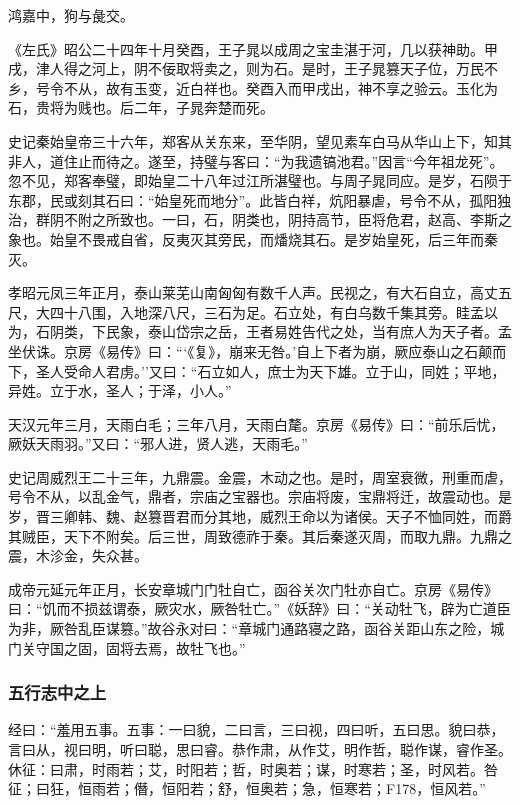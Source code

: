 \documentclass[]{article}
\begin{document}
鸿嘉中，狗与彘交。

《左氏》昭公二十四年十月癸酉，王子晁以成周之宝圭湛于河，几以获神助。甲戌，津人得之河上，阴不佞取将卖之，则为石。是时，王子晁篡天子位，万民不乡，号令不从，故有玉变，近白祥也。癸酉入而甲戌出，神不享之验云。玉化为石，贵将为贱也。后二年，子晁奔楚而死。

史记秦始皇帝三十六年，郑客从关东来，至华阴，望见素车白马从华山上下，知其非人，道住止而待之。遂至，持璧与客曰：``为我遗镐池君。''因言``今年祖龙死''。忽不见，郑客奉璧，即始皇二十八年过江所湛璧也。与周子晁同应。是岁，石陨于东郡，民或刻其石曰：``始皇死而地分''。此皆白祥，炕阳暴虐，号令不从，孤阳独治，群阴不附之所致也。一曰，石，阴类也，阴持高节，臣将危君，赵高、李斯之象也。始皇不畏戒自省，反夷灭其旁民，而燔烧其石。是岁始皇死，后三年而秦灭。

孝昭元凤三年正月，泰山莱芜山南匈匈有数千人声。民视之，有大石自立，高丈五尺，大四十八围，入地深八尺，三石为足。石立处，有白乌数千集其旁。眭孟以为，石阴类，下民象，泰山岱宗之岳，王者易姓告代之处，当有庶人为天子者。孟坐伏诛。京房《易传》曰：```《复》，崩来无咎。'自上下者为崩，厥应泰山之石颠而下，圣人受命人君虏。''又曰：``石立如人，庶士为天下雄。立于山，同姓；平地，异姓。立于水，圣人；于泽，小人。''

天汉元年三月，天雨白毛；三年八月，天雨白氂。京房《易传》曰：``前乐后忧，厥妖天雨羽。''又曰：``邪人进，贤人逃，天雨毛。''

史记周威烈王二十三年，九鼎震。金震，木动之也。是时，周室衰微，刑重而虐，号令不从，以乱金气，鼎者，宗庙之宝器也。宗庙将废，宝鼎将迁，故震动也。是岁，晋三卿韩、魏、赵篡晋君而分其地，威烈王命以为诸侯。天子不恤同姓，而爵其贼臣，天下不附矣。后三世，周致德祚于秦。其后秦遂灭周，而取九鼎。九鼎之震，木沴金，失众甚。

成帝元延元年正月，长安章城门门牡自亡，函谷关次门牡亦自亡。京房《易传》曰：``饥而不损兹谓泰，厥灾水，厥咎牡亡。''《妖辞》曰：``关动牡飞，辟为亡道臣为非，厥咎乱臣谋篡。''故谷永对曰：``章城门通路寝之路，函谷关距山东之险，城门关守国之固，固将去焉，故牡飞也。''

\hypertarget{header-n2146}{%
\subsubsection{五行志中之上}\label{header-n2146}}

经曰：``羞用五事。五事：一曰貌，二曰言，三曰视，四曰听，五曰思。貌曰恭，言曰从，视曰明，听曰聪，思曰睿。恭作肃，从作艾，明作哲，聪作谋，睿作圣。休征：曰肃，时雨若；艾，时阳若；哲，时奥若；谋，时寒若；圣，时风若。咎征；曰狂，恒雨若；僭，恒阳若；舒，恒奥若；急，恒寒若；F178，恒风若。''
\end{document}

